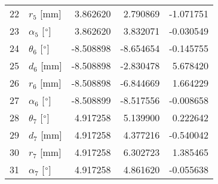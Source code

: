 \documentclass{standalone}%
\begin{document}
\begin{tabular}{llrrr}
22 &              $r_{5}$ [mm] &  3.862620 &   2.790869 &  -1.071751 \\
23 &  $\alpha_{5}$ [$\degree$] &  3.862620 &   3.832071 &  -0.030549 \\
24 &  $\theta_{6}$ [$\degree$] & -8.508898 &  -8.654654 &  -0.145755 \\
25 &              $d_{6}$ [mm] & -8.508898 &  -2.830478 &   5.678420 \\
26 &              $r_{6}$ [mm] & -8.508898 &  -6.844669 &   1.664229 \\
27 &  $\alpha_{6}$ [$\degree$] & -8.508899 &  -8.517556 &  -0.008658 \\
28 &  $\theta_{7}$ [$\degree$] &  4.917258 &   5.139900 &   0.222642 \\
29 &              $d_{7}$ [mm] &  4.917258 &   4.377216 &  -0.540042 \\
30 &              $r_{7}$ [mm] &  4.917258 &   6.302723 &   1.385465 \\
31 &  $\alpha_{7}$ [$\degree$] &  4.917258 &   4.861620 &  -0.055638 \\
\bottomrule
\end{tabular}
%
\end{document}
